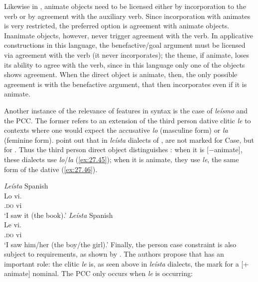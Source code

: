 \documentclass[output=paper]{langsci/langscibook}
\begin{document}
Likewise in  \citep{Baker1996}, animate objects need to be licensed
either by incorporation to the verb or by agreement with the auxiliary verb.
Since incorporation with animates is very restricted, the preferred option is
agreement with animate objects. Inanimate objects, however, never trigger
agreement with the verb. In applicative constructions in this language, the
benefactive/goal argument must be licensed via agreement with the verb (it
never incorporates); the theme, if animate, loses its ability to agree with the
verb, since in this language only one of the objects shows agreement. When the
direct object is animate, then, the only possible agreement is with the
benefactive argument, that then incorporates even if it is animate.

Another instance of the relevance of  features in syntax is the
case of \emph{leísmo} and the \gls{PCC}. The former
refers to an extension of the third person dative clitic
\emph{le} to contexts where one would expect the accusative  \emph{lo}
(masculine form) or \emph{la} (feminine form).
\citet[319--320]{OrmazabalRomero2013} point out that in \emph{leísta} dialects
of ,  are not marked for Case, but for .
Thus the third person direct object distinguishes : when it is
[$-$animate], these dialects use \emph{lo}/\emph{la} (\ref{ex:27.45}); when
it is animate, they use \emph{le}, the same form of the dative
(\ref{ex:27.46}).

\ea\label{ex:27.45} \emph{Leísta} Spanish\\
    \gll    Lo vi.\\
            \Tsg{}.\textsc{do} vi\\
    \glt    `I saw it (the book).'
\ex\label{ex:27.46} \emph{Leísta} Spanish\\
    \gll    Le vi.\\
            \Tsg{}.\textsc{do}   vi\\
    \glt    `I saw him/her (the boy/the girl).'
\z
Finally, the person case constraint is also subject to  requirements, as
shown by \citet{OrmazabalRomero2007,OrmazabalRomero2013}. The authors propose that  has
an important role: the clitic \emph{le} is, as seen above in \emph{leísta}
dialects, the mark for a [$+$animate] nominal. The \gls{PCC} only occurs when \emph{le} is occurring:
\end{document}
